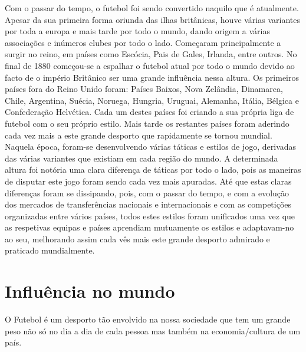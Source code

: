 \documentclass[a4paper,12pt]{report}
\begin{document}
Com o passar do tempo, o futebol foi sendo convertido naquilo que é atualmente. Apesar da sua primeira forma oriunda das ilhas britânicas, houve várias variantes por toda a europa e mais tarde por todo o mundo, dando origem a várias associações e inúmeros clubes por todo o lado. Começaram principalmente a surgir no reino, em países como Escócia, Pais de Gales, Irlanda, entre outros. No final de 1880 começou-se a espalhar o futebol atual por todo o mundo devido ao facto de o império Britânico ser uma grande influência nessa altura. Os primeiros países fora do Reino Unido foram: Países Baixos, Nova Zelândia, Dinamarca, Chile, Argentina, Suécia, Noruega, Hungria, Uruguai, Alemanha, Itália, Bélgica e Confederação Helvética. Cada um destes países foi criando a sua própria liga de futebol com o seu próprio estilo. Mais tarde os restantes países foram aderindo cada vez mais a este grande desporto que rapidamente se tornou mundial. \\
Naquela época, foram-se desenvolvendo várias táticas e estilos de jogo, derivadas das várias variantes que existiam em cada região do mundo. A determinada altura foi notória uma clara diferença de táticas por todo o lado, pois as maneiras de disputar este jogo foram sendo cada vez mais apuradas. Até que estas claras diferenças foram se dissipando, pois, com o passar do tempo, e com a evolução dos mercados de transferências nacionais e internacionais e com as competições organizadas entre vários países, todos estes estilos foram unificados uma vez que as respetivas equipas e países aprendiam mutuamente os estilos e adaptavam-no ao seu, melhorando assim cada vês mais este grande desporto admirado e praticado mundialmente.

\section{Influência no mundo }
\label{Influência no mundo}

O Futebol é um desporto tão envolvido na nossa sociedade que tem um grande peso não só no dia a dia de cada pessoa mas também na economia/cultura de um país.
\end{document}

